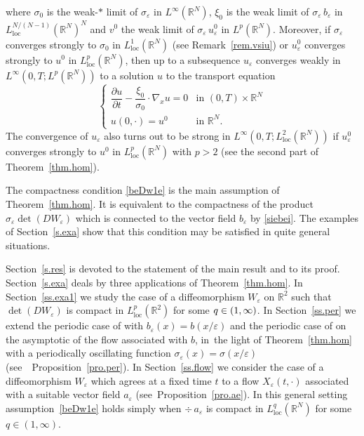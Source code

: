 \documentclass[11pt]{article}
\newcommand{\loc}{\mathrm{loc}}
\newcommand{\spfrac}[2]{{#1}/{(#2)}}
\def \RR {\mathbb R}
\theoremstyle{plain}
\theoremstyle{definition}
\numberwithin{equation}{section}
\begin{document}
where $\sigma_0$ is the weak-$\ast$ limit of $\sigma_\varepsilon$ in $L^\infty(\RR^N)$, $\xi_0$ is the weak limit of $\sigma_\varepsilon\,b_\varepsilon$ in $L^{\spfrac{N}{N-1}}_\loc(\RR^N)^N$ and $v^0$ the weak limit of $\sigma_\varepsilon\,u_\varepsilon^0$ in $L^p(\RR^N)$. Moreover, if $\sigma_\varepsilon$ converges strongly to $\sigma_0$ in $L^1_\loc(\RR^N)$ (see Remark~\ref{rem.vsiu}) or $u_\varepsilon^0$ converges strongly to $u^0$ in $L^p_\loc(\RR^N)$, then up to a subsequence $u_\varepsilon$ converges weakly in $L^\infty(0,T;L^p(\RR^N))$ to a solution $u$ to the transport equation
\begin{equation}\label{equ1}
\begin{cases}
\dfrac{\partial u}{\partial t}-\dfrac{\xi_0}{\sigma_0}\cdot\nabla_x u=0 & \mbox{in }(0,T)\times\RR^N
\\[5pt]
u(0,\cdot)=u^0 & \mbox{in }\RR^N.
\end{cases}
\end{equation}
The convergence of $u_\varepsilon$ also turns out to be strong in $L^\infty(0,T;L^2_\loc(\RR^N))$ if $u_\varepsilon^0$ converges strongly to $u^0$ in $L^p_\loc(\RR^N)$ with $p>2$ (see the second part of Theorem~\ref{thm.hom}).

The compactness condition \eqref{beDw1e} is the main assumption of Theorem~\ref{thm.hom}. It is equivalent to the compactness of the product $\sigma_\varepsilon\det(DW_\varepsilon)$ which is connected to the vector field $b_\varepsilon$ by \eqref{siebei}. The examples of Section~\ref{s.exa} show that this condition may be satisfied in quite general situations.

Section~\ref{s.res} is devoted to the statement of the main result and to its proof.
Section~\ref{s.exa} deals by three applications of Theorem~\ref{thm.hom}.
In Section~\ref{ss.exa1} we study the case of a diffeomorphism $W_\varepsilon$ on $\RR^2$ such that $\det(DW_\varepsilon)$ is compact in $L^p_\loc(\RR^2)$ for some $q\in\nobreak (1,\infty)$. In Section~\ref{ss.per} we extend the periodic case of \cite{Bre,HoXi,Tas} with $b_\varepsilon(x)=b(x/\varepsilon)$ and the periodic case of \cite[\S 4]{Bri} on the asymptotic of the flow associated with $b$, in~the light of Theorem~\ref{thm.hom} with a periodically oscillating function $\sigma_\varepsilon(x)=\sigma(x/\varepsilon)$ (see~ Proposition~\ref{pro.per}). In Section~\ref{ss.flow} we consider the case of a diffeomorphism $W_\varepsilon$ which agrees at a fixed time $t$ to a flow $X_\varepsilon(t,\cdot)$ associated with a suitable vector field $a_\varepsilon$ (see~Proposition~\ref{pro.ae}). In this general setting assumption~\eqref{beDw1e} holds simply when $\div\,a_\varepsilon$ is compact in $L^q_\loc(\RR^N)$ for some $q\in(1,\infty)$.
\end{document}
